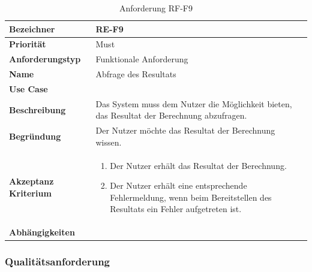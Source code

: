 \begin{table}[ht]
\centering
  \begin{tabular}{ l | p{8cm} }
	\hline
	\rowcolor{gray}
	\textbf{Bezeichner}&	\textbf{RE-F9}\\ \hline
	\textbf{Priorität} 		&	Must\\ \hline
	\textbf{Anforderungstyp}	&	Funktionale Anforderung\\ \hline
	\textbf{Name} 			&	Abfrage des Resultats\\ \hline
	\textbf{Use Case} 		&	\nameref{table:use_case_6}\\ \hline
	\textbf{Beschreibung} 	&	Das System muss dem Nutzer die Möglichkeit bieten, das Resultat der Berechnung abzufragen.\\ \hline
	\textbf{Begründung} 		&	Der Nutzer möchte das Resultat der Berechnung wissen.\\ \hline
	\textbf{Akzeptanz Kriterium}	&	\begin{enumerate}
					\item Der Nutzer erhält das Resultat der Berechnung.
					\item Der Nutzer erhält eine entsprechende Fehlermeldung, wenn beim Bereitstellen des Resultats ein Fehler aufgetreten ist.
					\end{enumerate}
					\\ \hline
	\textbf{Abhängigkeiten} 	&	\nameref{table:req_2}\\ \hline
  \end{tabular}
   \caption{Anforderung RF-F9}\label{table:req_9}
\end{table}

\newpage
\FloatBarrier
\subsubsection{Qualitätsanforderung}\label{non_func_anforderungen}


